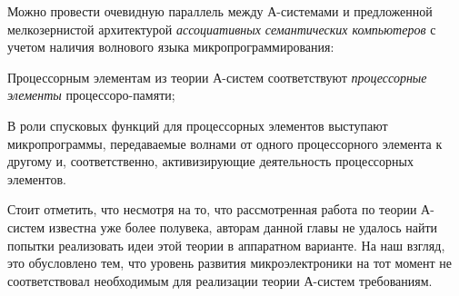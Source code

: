 \begin{textitemize}
	Можно провести очевидную параллель между А-системами и предложенной мелкозернистой архитектурой \textit{ассоциативных семантических компьютеров} с учетом наличия волнового языка микропрограммирования:
	\begin{textitemize}
		\item Процессорным элементам из теории А-систем соответствуют \textit{процессорные элементы} процессоро-памяти;
		\item В роли спусковых функций для процессорных элементов выступают микропрограммы, передаваемые волнами от одного процессорного элемента к другому и, соответственно, активизирующие деятельность процессорных элементов.
	\end{textitemize}

	Стоит отметить, что несмотря на то, что рассмотренная работа по теории А-систем известна уже более полувека, авторам данной главы не удалось найти попытки реализовать идеи этой теории в аппаратном варианте. На наш взгляд, это обусловлено тем, что уровень развития микроэлектроники на тот момент не соответствовал необходимым для реализации теории А-систем требованиям.
\end{textitemize}

